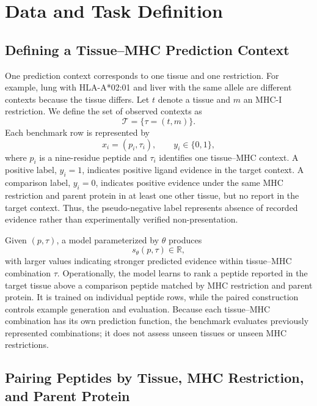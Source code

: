 \section{Data and Task Definition}

\subsection{Defining a Tissue--MHC Prediction Context}

One prediction context corresponds to one tissue and one \plainMHCI{} restriction. For example, lung with HLA-A*02:01 and liver with the same allele are different contexts because the tissue differs. Let \(t\) denote a tissue and \(m\) an MHC-I restriction. We define the set of observed contexts as
\[
\mathcal{T}=\{\tau=(t,m)\}.
\]
Each benchmark row is represented by
\[
x_i=(p_i,\tau_i), \qquad y_i\in\{0,1\},
\]
where \(p_i\) is a nine-residue peptide and \(\tau_i\) identifies one tissue--MHC context. A positive label, \(y_i=1\), indicates positive ligand evidence in the target context. A comparison label, \(y_i=0\), indicates positive evidence under the same MHC restriction and parent protein in at least one other tissue, but no report in the target context. Thus, the pseudo-negative label represents absence of recorded evidence rather than experimentally verified non-presentation.

Given \((p,\tau)\), a model parameterized by \(\theta\) produces
\[
s_{\theta}(p,\tau)\in\mathbb{R},
\]
with larger values indicating stronger predicted evidence within tissue--MHC combination \(\tau\). Operationally, the model learns to rank a peptide reported in the target tissue above a comparison peptide matched by MHC restriction and parent protein. It is trained on individual peptide rows, while the paired construction controls example generation and evaluation. Because each tissue--MHC combination has its own prediction function, the benchmark evaluates previously represented combinations; it does not assess unseen tissues or unseen MHC restrictions.

\subsection{Pairing Peptides by Tissue, MHC Restriction, and Parent Protein}

